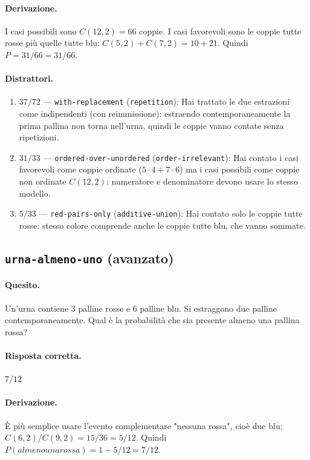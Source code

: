 \paragraph{Derivazione.} I casi possibili sono $C(12,2) = 66$ coppie. I casi favorevoli sono le coppie tutte rosse più quelle tutte blu: $C(5,2) + C(7,2) = 10 + 21$. Quindi $P = 31/66 = 31/66$.

\paragraph{Distrattori.}
\begin{enumerate}
  \item $37/72$ --- \texttt{with-replacement} (\texttt{repetition}): Hai trattato le due estrazioni come indipendenti (con reimmissione): estraendo contemporaneamente la prima pallina non torna nell'urna, quindi le coppie vanno contate senza ripetizioni.
  \item $31/33$ --- \texttt{ordered-over-unordered} (\texttt{order-irrelevant}): Hai contato i casi favorevoli come coppie ordinate ($5\cdot 4 + 7\cdot 6$) ma i casi possibili come coppie non ordinate $C(12,2)$: numeratore e denominatore devono usare lo stesso modello.
  \item $5/33$ --- \texttt{red-pairs-only} (\texttt{additive-union}): Hai contato solo le coppie tutte rosse: \guillemotleft{}stesso colore\guillemotright{} comprende anche le coppie tutte blu, che vanno sommate.
\end{enumerate}

\subsection{\texorpdfstring{\texttt{urna-almeno-uno} (avanzato)}{urna-almeno-uno (avanzato)}}

\paragraph{Quesito.} Un'urna contiene 3 palline rosse e 6 palline blu. Si estraggono due palline contemporaneamente. Qual è la probabilità che sia presente almeno una pallina rossa?

\paragraph{Risposta corretta.} $7/12$

\paragraph{Derivazione.} È più semplice usare l'evento complementare "nessuna rossa", cioè due blu: $C(6,2)/C(9,2) = 15/36 = 5/12$. Quindi $P(almeno una rossa) = 1 - 5/12 = 7/12$.

